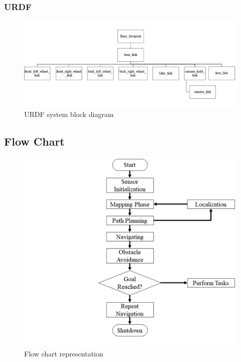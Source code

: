 \subsubsection{URDF}
	\begin{figure}[H]
		\centering
		\includegraphics[scale=0.9]{images/Content/URDF_block_dia.png}
		\caption{URDF system block diagram}
		\label{fig:fig2}
	\end{figure}


\subsection{\fontsize{14}{16} Flow Chart}
	\begin{figure}[H]
		\centering
		\includegraphics{images/Content/flow_chart.png}
		\caption{Flow chart representation}
		\label{fig:fig3}
	\end{figure}

